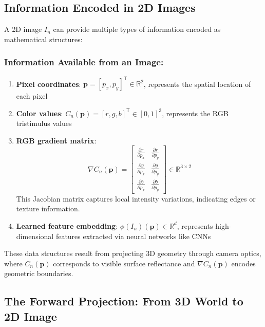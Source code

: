 \documentclass[12pt]{article}
\newcommand{\R}{\mathbb{R}}
\newcommand{\vect}[1]{\bm{#1}}
\theoremstyle{definition}
\begin{document}
\subsection{Information Encoded in 2D Images}

A 2D image $I_n$ can provide multiple types of information encoded as mathematical structures:

\subsubsection*{Information Available from an Image:}
\begin{enumerate}[label=(\roman*)]
    \item \textbf{Pixel coordinates}: $\vect{p} = [p_x, p_y]^\mathsf{T} \in \R^2$, represents the spatial location of each pixel
    
    \item \textbf{Color values}: $C_n(\vect{p}) = [r, g, b]^\mathsf{T} \in [0,1]^3$, represents the RGB tristimulus values
    
    \item \textbf{RGB gradient matrix}:
    \begin{equation}
        \nabla C_n(\vect{p}) = \begin{bmatrix}
            \frac{\partial r}{\partial p_x} & \frac{\partial r}{\partial p_y} \\[0.5em]
            \frac{\partial g}{\partial p_x} & \frac{\partial g}{\partial p_y} \\[0.5em]
            \frac{\partial b}{\partial p_x} & \frac{\partial b}{\partial p_y}
        \end{bmatrix} \in \R^{3 \times 2} \label{eq:gradient}
    \end{equation}
    This Jacobian matrix captures local intensity variations, indicating edges or texture information.
    
    \item \textbf{Learned feature embedding}: $\phi(I_n)(\vect{p}) \in \R^d$, represents high-dimensional features extracted via neural networks like CNNs
\end{enumerate}

These data structures result from projecting 3D geometry through camera optics, where $C_n(\vect{p})$ corresponds to visible surface reflectance and $\nabla C_n(\vect{p})$ encodes geometric boundaries.

\newpage    

\subsection{The Forward Projection: From 3D World to 2D Image}
\end{document}
